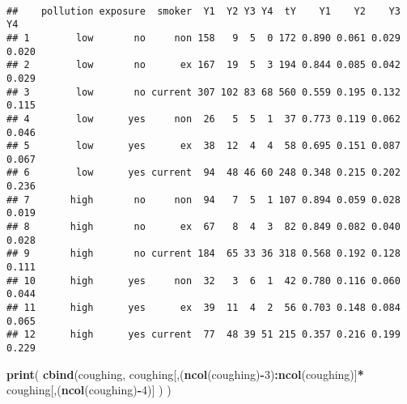 \documentclass[]{article}
\newenvironment{Shaded}{\begin{snugshade}}{\end{snugshade}}
\newcommand{\KeywordTok}[1]{\textcolor[rgb]{0.13,0.29,0.53}{\textbf{#1}}}
\newcommand{\DataTypeTok}[1]{\textcolor[rgb]{0.13,0.29,0.53}{#1}}
\newcommand{\DecValTok}[1]{\textcolor[rgb]{0.00,0.00,0.81}{#1}}
\newcommand{\StringTok}[1]{\textcolor[rgb]{0.31,0.60,0.02}{#1}}
\newcommand{\OperatorTok}[1]{\textcolor[rgb]{0.81,0.36,0.00}{\textbf{#1}}}
\newcommand{\NormalTok}[1]{#1}
\begin{document}
~

\begin{Shaded}
\end{Shaded}

\begin{verbatim}
##    pollution exposure  smoker  Y1  Y2 Y3 Y4  tY    Y1    Y2    Y3    Y4
## 1        low       no     non 158   9  5  0 172 0.890 0.061 0.029 0.020
## 2        low       no      ex 167  19  5  3 194 0.844 0.085 0.042 0.029
## 3        low       no current 307 102 83 68 560 0.559 0.195 0.132 0.115
## 4        low      yes     non  26   5  5  1  37 0.773 0.119 0.062 0.046
## 5        low      yes      ex  38  12  4  4  58 0.695 0.151 0.087 0.067
## 6        low      yes current  94  48 46 60 248 0.348 0.215 0.202 0.236
## 7       high       no     non  94   7  5  1 107 0.894 0.059 0.028 0.019
## 8       high       no      ex  67   8  4  3  82 0.849 0.082 0.040 0.028
## 9       high       no current 184  65 33 36 318 0.568 0.192 0.128 0.111
## 10      high      yes     non  32   3  6  1  42 0.780 0.116 0.060 0.044
## 11      high      yes      ex  39  11  4  2  56 0.703 0.148 0.084 0.065
## 12      high      yes current  77  48 39 51 215 0.357 0.216 0.199 0.229
\end{verbatim}

\begin{Shaded}
\begin{Highlighting}[]
\KeywordTok{print}\NormalTok{( }\KeywordTok{cbind}\NormalTok{(coughing, coughing[,(}\KeywordTok{ncol}\NormalTok{(coughing)}\OperatorTok{-}\DecValTok{3}\NormalTok{)}\OperatorTok{:}\KeywordTok{ncol}\NormalTok{(coughing)]}\OperatorTok{*}
\StringTok{    }\NormalTok{coughing[,(}\KeywordTok{ncol}\NormalTok{(coughing)}\OperatorTok{-}\DecValTok{4}\NormalTok{)] ) )}
\end{Highlighting}
\end{Shaded}
\end{document}
